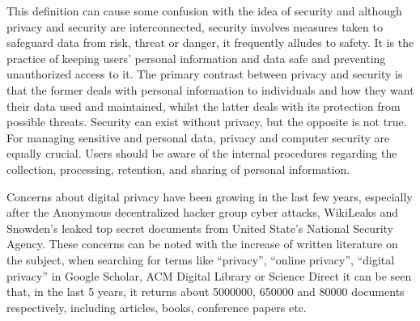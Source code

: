 \documentclass[conference]{IEEEtran}
\begin{document}

This definition can cause some confusion with the idea of security \cite{HIVDifference}
and although privacy and security are interconnected, security involves
measures taken to safeguard data from risk, threat or danger, it frequently
alludes to safety. It is the practice of keeping users' personal information
and data safe and preventing unauthorized access to it. The primary contrast
between privacy and security is that the former deals with personal information
to individuals and how they want their data used and maintained, whilst
the latter deals with its protection from possible threats. Security can
exist without privacy, but the opposite is not true. For managing sensitive
and personal data, privacy and computer security are equally crucial. Users
should be aware of the internal procedures regarding the collection, processing,
retention, and sharing of personal information.

Concerns about digital privacy have been growing \cite{emami2019exploring, park2022personal, zhang2022peer}
in the last few years, especially after the Anonymous decentralized hacker
group cyber attacks, WikiLeaks and Snowden's leaked top secret documents
from United State's National Security Agency. These concerns can be noted
with the increase of written literature on the subject, when searching for
terms like ``privacy'', ``online privacy'', ``digital privacy'' in Google
Scholar, ACM Digital Library or Science Direct it can be seen that, in the
last 5 years, it returns about 5000000, 650000 and 80000 documents respectively,
including articles, books, conference papers etc.
\end{document}
